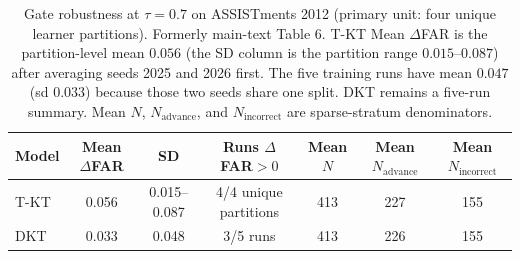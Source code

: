 \begin{table}[htbp]
\caption{Gate robustness at $\tau=0.7$ on ASSISTments 2012 (primary unit: four unique learner partitions). Formerly main-text Table 6. T-KT Mean $\Delta$FAR is the partition-level mean $0.056$ (the SD column is the partition range $0.015$--$0.087$) after averaging seeds 2025 and 2026 first. The five training runs have mean $0.047$ (sd $0.033$) because those two seeds share one split. DKT remains a five-run summary. Mean $N$, $N_{\mathrm{advance}}$, and $N_{\mathrm{incorrect}}$ are sparse-stratum denominators.}
\label{tab:s6_far_robustness}
\centering
\small
\begin{tabular}{lcccccc}
\toprule
Model & Mean $\Delta$FAR & SD & Runs $\Delta$FAR$>0$ & Mean $N$ & Mean $N_{\mathrm{advance}}$ & Mean $N_{\mathrm{incorrect}}$ \\
\midrule
T-KT & 0.056 & 0.015--0.087 & 4/4 unique partitions & 413 & 227 & 155 \\
DKT & 0.033 & 0.048 & 3/5 runs & 413 & 226 & 155 \\
\bottomrule
\end{tabular}
\end{table}
